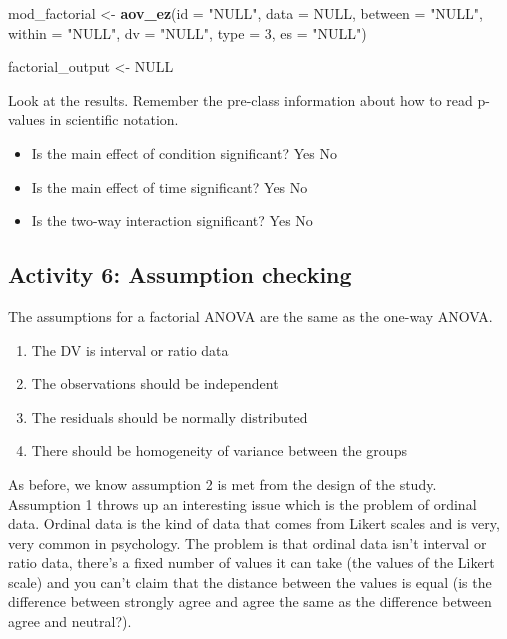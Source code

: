 \documentclass[]{book}
\newenvironment{Shaded}{\begin{snugshade}}{\end{snugshade}}
\newcommand{\DataTypeTok}[1]{\textcolor[rgb]{0.13,0.29,0.53}{#1}}
\newcommand{\DecValTok}[1]{\textcolor[rgb]{0.00,0.00,0.81}{#1}}
\newcommand{\KeywordTok}[1]{\textcolor[rgb]{0.13,0.29,0.53}{\textbf{#1}}}
\newcommand{\NormalTok}[1]{#1}
\newcommand{\OtherTok}[1]{\textcolor[rgb]{0.56,0.35,0.01}{#1}}
\newcommand{\StringTok}[1]{\textcolor[rgb]{0.31,0.60,0.02}{#1}}
\providecommand{\tightlist}{%
  \setlength{\itemsep}{0pt}\setlength{\parskip}{0pt}}
\begin{document}
\begin{Shaded}
\begin{Highlighting}[]
\NormalTok{mod_factorial <-}\StringTok{ }\KeywordTok{aov_ez}\NormalTok{(}\DataTypeTok{id =} \StringTok{"NULL"}\NormalTok{,}
               \DataTypeTok{data =} \OtherTok{NULL}\NormalTok{, }
               \DataTypeTok{between =} \StringTok{"NULL"}\NormalTok{, }
               \DataTypeTok{within =} \StringTok{"NULL"}\NormalTok{,}
               \DataTypeTok{dv =} \StringTok{"NULL"}\NormalTok{, }
               \DataTypeTok{type =} \DecValTok{3}\NormalTok{,}
               \DataTypeTok{es =} \StringTok{"NULL"}\NormalTok{) }

\NormalTok{factorial_output <-}\StringTok{ }\OtherTok{NULL}
\end{Highlighting}
\end{Shaded}

Look at the results. Remember the pre-class information about how to read p-values in scientific notation.

\begin{itemize}
\tightlist
\item
  Is the main effect of condition significant? Yes No
\item
  Is the main effect of time significant? Yes No
\item
  Is the two-way interaction significant? Yes No
\end{itemize}

\hypertarget{activity-6-assumption-checking}{%
\subsection{Activity 6: Assumption checking}\label{activity-6-assumption-checking}}

The assumptions for a factorial ANOVA are the same as the one-way ANOVA.

\begin{enumerate}
\def\labelenumi{\arabic{enumi}.}
\tightlist
\item
  The DV is interval or ratio data
\item
  The observations should be independent
\item
  The residuals should be normally distributed
\item
  There should be homogeneity of variance between the groups
\end{enumerate}

As before, we know assumption 2 is met from the design of the study. Assumption 1 throws up an interesting issue which is the problem of ordinal data. Ordinal data is the kind of data that comes from Likert scales and is very, very common in psychology. The problem is that ordinal data isn't interval or ratio data, there's a fixed number of values it can take (the values of the Likert scale) and you can't claim that the distance between the values is equal (is the difference between strongly agree and agree the same as the difference between agree and neutral?).
\end{document}
